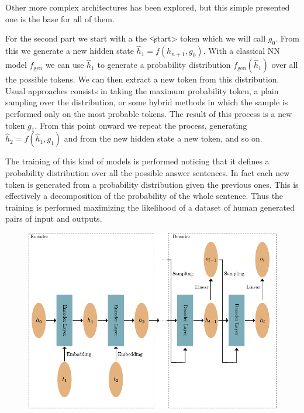 \documentclass[]{marticle}
\begin{document}
Other more complex architectures has been explored, but this simple presented one is the base for
all of them.

For the second part we start with a the \c{<start>} token which we will call $g_0$. From this we
generate a new hidden state $\hat{h}_1 = f(h_{n+1}, g_0)$. With a classical NN model $f_\text{gen}$ we can
use $\hat{h}_1$ to generate a probability distribution $f_\text{gen} (\hat{h}_1)$ over all the possible
tokens. We can then extract a new token from this distribution. Usual approaches consists in taking
the maximum probability token, a plain sampling over the distribution, or some hybrid methods in
which the sample is performed only on the most probable tokens. The result of this process is a new
token $g_1$. From this point onward we repeat the process, generating $\hat{h}_2 = f(\hat{h}_1, g_1)$
and from the new hidden state a new token, and so on.

The training of this kind of models is performed noticing that it defines a probability distribution
over all the possible answer sentences. In fact each new token is generated from a probability
distribution given the previous ones. This is effectively a decomposition of the probability of the
whole sentence. Thus the training is performed maximizing the likelihood of a dataset of human
generated pairs of input and outputs.

\begin{figure}[!h] 
\begin{center}
\includegraphics{recurrent_simple.pdf}
\caption{} 
\end{center}
\end{figure}
\end{document}
